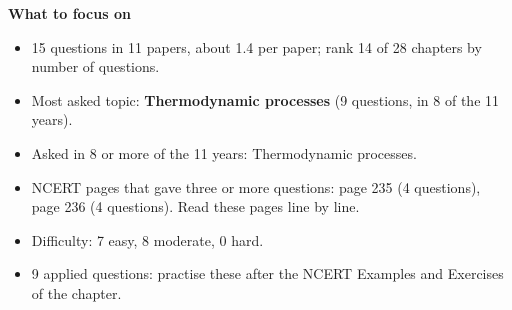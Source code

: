 \begin{minipage}[t]{0.63\linewidth}{\small\textbf{\color{crimson}What to focus on}\par\smallskip
\begin{itemize}[leftmargin=1.1em,itemsep=1pt,topsep=0pt]
\item 15 questions in 11 papers, about 1.4 per paper; rank 14 of 28 chapters by number of questions.
\item Most asked topic: \textbf{Thermodynamic processes} (9 questions, in 8 of the 11 years).
\item Asked in 8 or more of the 11 years: Thermodynamic processes.
\item NCERT pages that gave three or more questions: page 235 (4 questions), page 236 (4 questions). Read these pages line by line.
\item Difficulty: 7 easy, 8 moderate, 0 hard.
\item 9 applied questions: practise these after the NCERT Examples and Exercises of the chapter.
\end{itemize}}\end{minipage}\par
{}
